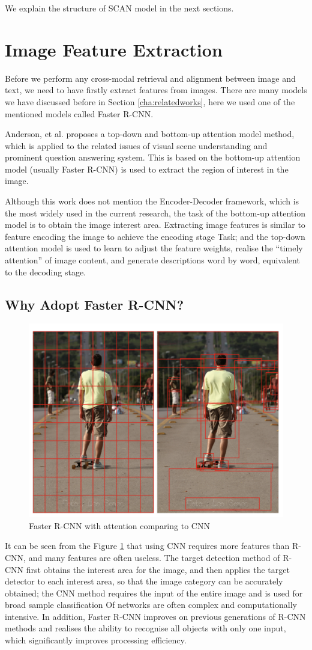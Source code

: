 We explain the structure of SCAN model in the next sections.

\section{Image Feature Extraction}
Before we perform any cross-modal retrieval and alignment between image and text, we need to have firstly extract features from images. There are many models we have discussed before in Section \ref{cha:relatedworks}, here we used one of the mentioned models called Faster R-CNN. 

Anderson, et al. \cite{bottomup} proposes a top-down and bottom-up attention model method, which is applied to the related issues of visual scene understanding and prominent question answering system. This is based on the bottom-up attention model (usually Faster R-CNN) is used to extract the region of interest in the image. 

Although this work \cite{bottomup} does not mention the Encoder-Decoder framework, which is the most widely used in the current research, the task of the bottom-up attention model is to obtain the image interest area. Extracting image features is similar to feature encoding the image to achieve the encoding stage Task; and the top-down attention model is used to learn to adjust the feature weights, realise the ``timely attention'' of image content, and generate descriptions word by word, equivalent to the decoding stage.


\subsection{Why Adopt Faster R-CNN?}

\begin{figure}[h!]
\centering
\includegraphics[width=.4\textwidth]{whyfasterrcnn.pdf}
\caption{Faster R-CNN with attention comparing to CNN \cite{bottomup}}
\label{fig:fasterrcnnbottomup}
\end{figure}

It can be seen from the Figure \ref{fig:fasterrcnnbottomup} that using CNN requires more features than R-CNN, and many features are often useless. The target detection method of R-CNN first obtains the interest area for the image, and then applies the target detector to each interest area, so that the image category can be accurately obtained; the CNN method requires the input of the entire image and is used for broad sample classification Of networks are often complex and computationally intensive. In addition, Faster R-CNN improves on previous generations of R-CNN methods and realises the ability to recognise all objects with only one input, which significantly improves processing efficiency.

